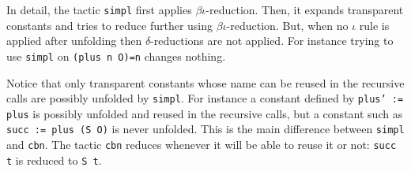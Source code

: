 \begin{coq_example*}
In detail, the tactic \texttt{simpl} first applies
$\beta\iota$-reduction.  Then, it expands transparent constants and
tries to reduce further using $\beta\iota$-reduction. But, when no
$\iota$ rule is applied after unfolding then $\delta$-reductions are
not applied. For instance trying to use \texttt{simpl} on
\texttt{(plus n O)=n} changes nothing.

Notice that only transparent constants whose name can be reused in the
recursive calls are possibly unfolded by \texttt{simpl}. For instance
a constant defined by \texttt{plus' := plus} is possibly unfolded and
reused in the recursive calls, but a constant such as \texttt{succ :=
  plus (S O)} is never unfolded. This is the main difference between
\texttt{simpl} and \texttt{cbn}. The tactic \texttt{cbn} reduces
whenever it will be able to reuse it or not: \texttt{succ t} is
reduced to \texttt{S t}.

\end{coq_example*}
